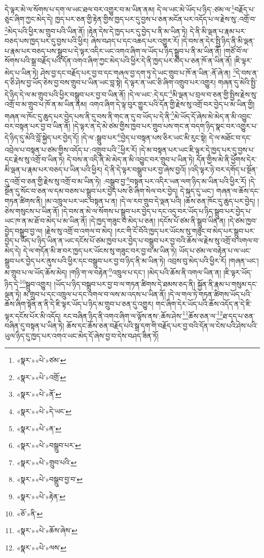 དེ་ལྟར་མེ་ལ་སོགས་པ་དག་ལ་ཡང་ཐལ་བར་འགྱུར་བ་མ་ཡིན་ནམ། དེ་ལ་ཡང་མེ་ཡོད་པ་ཉིད་:ཙམ་ལ་\footnote{«སྣར་»«པེ་»ཙམ་}བརྗོད་པ་ཅུང་ཞིག་ཀྱང་མེད་དེ། ཁྱད་པར་ཅན་གྱི་རྟེན་གྱིས་ཁྱད་པར་དུ་བྱས་པ་ཅན་མངོན་པར་འདོད་པ་ལ་རྗེས་སུ་:འགྲོ་བ་\footnote{«སྣར་»«པེ་»འགྲོ་}མེད་པའི་ཕྱིར་མ་གྲུབ་པའི་ཡིན་ནོ། །རྟེན་དེས་དེ་ཁྱད་པར་དུ་བྱེད་པ་ནི་མ་ཡིན་ཏེ། དེ་ནི་མི་ལྡན་པ་རྣམ་པར་བཅད་པས་ཁྱད་པར་དུ་བྱས་པའི་ཕྱིར། ཞེས་བཤད་པ་དང་འཆད་པར་འགྱུར་རོ། །དེ་བས་ན་དེར་སྤྱི་ཉིད་ནི་མི་ལྡན་པ་རྣམ་པར་བཅད་པས་སྒྲུབ་པ་དེ་ལྟར་འདིར་ཡང་འགའ་ཞིག་ལ་ཡོད་པ་ཉིད་སྒྲུབ་པ་ནི་མ་ཡིན་ནོ། །གཙོ་བོ་ལ་སོགས་པའི་སྒྲ་བརྗོད་པའི་དོན་འགའ་ཞིག་ཀྱང་མེད་པའི་ཕྱིར་དེ་ནི་ཁྱད་པར་མེད་པ་ཅན་ཁོ་ན་ཡིན་ནོ། །ཇི་ལྟར་མེད་པ་ཡིན་ཏེ། ཤེས་བྱ་དང་བརྗོད་པར་བྱ་བ་དང་གཞལ་བྱ་དག་ཏུ་དེ་ཡང་གྲུབ་པ་ཁོ་ན་ཡིན་:ནོ་ཞེ་ན། \footnote{«སྣར་»«པེ་»ནོ་}དེ་བས་ན་ད་ཅི་ཤེས་བྱ་ཡོད་ཅེས་བྱ་བས་གྲུབ་པ་ཡིན་ཡང་བླ་སྟེ། དེ་ལྟར་ན་ཡང་ཅི་ཞིག་འགྲུབ་པར་འགྱུར། གཞན་དུ་མེའི་སྤྱི་དེ་ཉིད་དེ་ལ་མ་གྲུབ་པའི་ཕྱིར་བསྒྲུབ་པར་བྱ་བ་ཡིན་ནོ། །དེ་ལ་ཡང་:དེ་དང་\footnote{«སྣར་»«པེ་»དེ་ཡང་}མི་ལྡན་པ་བྲལ་བ་ཅན་གྱི་སྤྱིས་རྗེས་སུ་འགྲོ་བ་མ་གྲུབ་པ་ཁོ་ན་མ་ཡིན་ནམ། འགའ་ཞིག་དེ་ལྟ་བུར་གྱུར་པའི་དོན་གྱི་རྗེས་སུ་འགྲོ་བར་བྱེད་པ་མ་ཡིན་གྱི། གཞན་ལ་ཁོང་དུ་ཆུད་པར་བྱེད་པས་ནི་དུ་བས་ནི་གང་ན་དུ་བ་ཡོད་པ་དེ་ནི་\footnote{«སྣར་»«པེ་»ན་}མེ་ཡོད་དོ་ཞེས་མེ་མེད་ན་མི་འབྱུང་བར་བསྟན་པར་བྱ་བ་ཡིན་ནོ། །དེ་ལྟར་ན་དེ་མེ་ཙམ་གྱིས་ཁྱབ་པར་གྲུབ་པས་གང་ན་བདག་ཉིད་སྣང་བར་འགྱུར་པ་དེ་ཉིད་དུ་མེའི་བློ་སྐྱེད་པར་བྱེད་དོ། །དེ་ལ་:སྒྲུབ་པར་\footnote{«སྣར་»«པེ་»བསྒྲུབ་པར་}བྱེད་པ་བསྟན་པས་ཅིར་ཡང་མི་རུང་སྟེ། དེ་ལ་མཐོང་བ་དང་འབྲེལ་པ་བསྟན་པ་ཙམ་གྱིས་འདོད་པ་:འགྲུབ་པའི་\footnote{«སྣར་»«པེ་»གྲུབ་པའི་}ཕྱིར་རོ། །དེ་མ་བསྟན་པར་ཡང་ཇི་ལྟར་དེ་ཁྱད་པར་དུ་བྱས་པ་དང་རྗེས་སུ་འགྲོ་བ་ཡིན་ཏེ། དེ་བས་ན་འདི་ནི་མེ་མེད་ན་མི་འབྱུང་བར་གྲུབ་པ་ཡིན་ཏེ། དོན་གྱིས་མེ་ནི་ཕྱོགས་དེར་མི་ལྡན་པ་རྣམ་པར་བཅད་པ་ཡིན་པའི་ཕྱིར། དེ་ནི་དེ་ལྟར་བསྒྲུབ་པར་བྱ་ཞེས་བྱའོ། །འདི་ལྟར་ཉེ་བར་དགོད་པ་སྔོན་དུ་འགྲོ་བ་ཅན་གྱི་རྗེས་སུ་འགྲོ་བ་མ་ཡིན་ཏེ། :བསྒྲུབ་བྱ་\footnote{«སྣར་»«པེ་»བསྒྲུབ་བྱ་བ་}བསྟན་པར་འདིར་ཡན་ལག་ཉིད་མ་ཡིན་པའི་ཕྱིར་རོ། །དེ་སྔོན་དུ་སོང་བ་ཅན་ལ་དམ་བཅས་པ་སྒྲུབ་པར་བྱེད་པས་ཅི་ཞིག་སེལ་བར་བྱེད། དེ་སྐད་དུ་ཡང་། གཞན་ལ་ཆོས་དང་གཏན་ཚིགས་ནི། །མ་འཁྲུལ་པར་ཡང་བསྟན་པ་ན། །དེ་ལ་རབ་གྲུབ་དེ་ལྡན་པའི། །ཆོས་ཅན་ཁོང་དུ་ཆུད་པར་བྱེད། །ཅེས་གསུངས་པ་ཡིན་ནོ། །དེ་བས་ན་མེ་ལ་སོགས་པ་སྒྲུབ་པར་བྱེད་པ་དང་འདྲ་བར་ཡོད་པ་ཉིད་སྒྲུབ་པར་བྱེད་པ་ཡང་ཁ་ན་མ་ཐོ་བ་མེད་པ་མ་ཡིན་ནོ། །དེ་ཁྱད་གཟུང་བ་མེད་པ་ཅན། །དངོས་པོ་ཙམ་ནི་སྒྲུབ་ཡིན་ན། །དེ་ཙམ་ཁྱབ་བྱེད་བསྒྲུབ་བྱ་ལ། །རྗེས་སུ་འགྲོ་བ་འགལ་བ་མེད། །རང་གི་ངོ་བོའི་ཁྱད་པར་ཡོངས་སུ་གཟུང་བ་མེད་པར་སྒྲུབ་པར་བྱེད་པ་ཡོད་པ་ཉིད་ཡིན་ན་ཡང་དངོས་པོ་ཙམ་ཁྱབ་པར་བྱེད་པ་བསྒྲུབ་པར་བྱ་བའི་ཆོས་ལ་རྗེས་སུ་འགྲོ་བ་འགལ་བ་མེད་དེ། དེ་ལ་གདོན་མི་ཟ་བར་ཁྱད་པར་ཡོངས་སུ་གཟུང་བར་བྱ་བ་མ་ཡིན་ཏེ། ཡོད་པ་ཙམ་ལ་བརྟེན་པ་ལ་ཡང་སྒྲུབ་པར་བྱེད་པར་ནུས་པའི་ཕྱིར་དང་བསྒྲུབ་པར་བྱ་བ་ཉིད་ནི་མ་ཡིན་ཏེ། འབྲས་བུ་མེད་པའི་ཕྱིར་རོ། །གཞན་ཡང་། མ་གྲུབ་པ་ལ་ཡོད་ཆོས་མེད། །གཉི་ག་ལ་བརྟེན་\footnote{«སྣར་»«པེ་»རྟེན་}འཁྲུལ་པ་དང་། །མེད་པའི་ཆོས་ནི་འགལ་ཡིན་ན། །ཇི་ལྟར་ཡོད་ཉིད་དེ་\footnote{«ཅོ་»ནི་}སྒྲུབ་འགྱུར། །ཡོད་པ་ཉིད་བསྒྲུབ་པར་བྱ་བ་ལ་གཏན་ཚིགས་དེ་ཐམས་ཅད་ནི། སྐྱོན་ནི་རྣམ་པ་གསུམ་དང་ལྡན་ཏེ། མ་གྲུབ་པ་དང་འཁྲུལ་པ་དང་འགལ་བ་ལས་མ་འདས་པ་ཡིན་ནོ། །དེ་ལ་གལ་ཏེ་གཏན་ཚིགས་ཡོད་པའི་ཆོས་ཞིག་སྟོན་ན་ནི་དེ་ཇི་ལྟར་ཡོད་པ་ཉིད་མ་གྲུབ་པ་ཅན་དུ་འགྱུར། གང་ཞིག་དེར་ཡོད་པའི་ཆོས་འདོད་ན་དེ་ཇི་ལྟར་དངོས་པོར་མི་འདོད། རང་བཞིན་ཉིད་ནི་འགའ་ཞིག་ལ་ལྟོས་ནས་:ཆོས་ཤེས་\footnote{«སྣར་»«པེ་»ཆོས་ཞེས་}ཆོས་ཅན་ལ་\footnote{«སྣར་»«པེ་»ལས་}ཐ་དད་པ་ཅན་བཞིན་དུ་བསྟན་པ་ཡིན་ཏེ། ཆོས་དང་ཆོས་ཅན་བརྗོད་པའི་སྒྲ་དག་གི་བརྗོད་པར་བྱ་བའི་དོན་ལ་ངེས་པའི་ཤེས་པའི་ཡུལ་ཉིད་དུ་ཁྱད་པར་འགའ་ཡང་མེད་དོ་ཞེས་བྱ་བ་དེས་བཤད་ཟིན་ཏོ། 